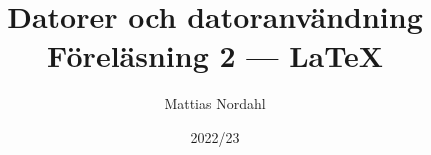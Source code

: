 \documentclass[trans]{beamer}
\begin{document}
 

\title{Datorer och datoranvändning\\Föreläsning 2 --- \LaTeX} 
\author[]{Mattias Nordahl} 
\date{} 

\frame[plain]{
\maketitle

\vspace{-2\baselineskip}
}

\date{2022/23} 


\end{document}
